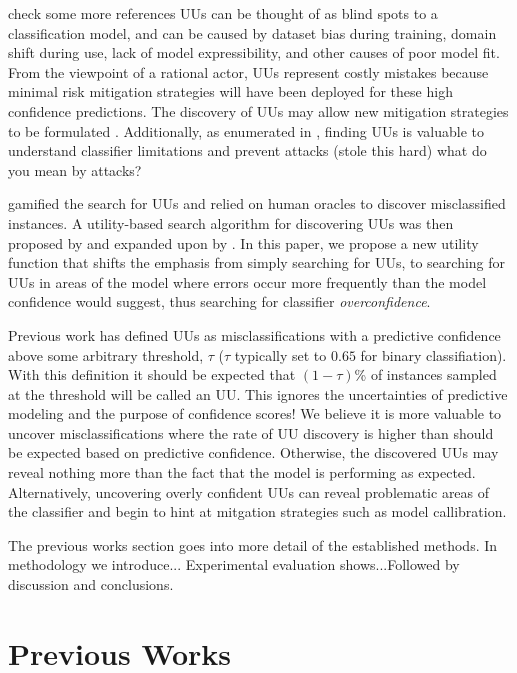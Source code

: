 \documentclass[letterpaper]{article} %
\newcommand{\km}[1]{{\color{red} #1}} %
\newcommand{\wdb}[1]{{\color{blue} #1}} %
\begin{document}
\wdb{check some more references}  UUs can be thought of as blind spots to a classification model, and can be caused by dataset bias during training, domain shift during use, lack of model expressibility, and other causes of poor model fit.  From the viewpoint of a rational actor, UUs represent costly mistakes because minimal risk mitigation strategies will have been deployed for these high confidence predictions.  The discovery of UUs may allow new mitigation strategies to be formulated \citep{Nushi2016a}.  \wdb{Additionally, as enumerated in \citep{Bansal2018}, finding UUs is valuable to understand classifier limitations and prevent attacks (stole this hard)} \km{what do you mean by attacks?}

\citet{Attenberg2015} gamified the search for UUs and relied on human oracles to discover misclassified instances. A utility-based search algorithm for discovering UUs was then proposed by \citet{Lakkaraju2016} and expanded upon by \citet{Bansal2018}. In this paper, we propose a new utility function that shifts the emphasis from simply searching for UUs, to searching for UUs in areas of the model where errors occur more frequently than the model confidence would suggest, thus searching for classifier \textit{overconfidence}. 

Previous work has defined UUs as misclassifications with a predictive confidence above some arbitrary threshold, $\tau$ ($\tau$ typically set to $0.65$ for binary classifiation).  With this definition it should be expected that $(1-\tau)$\% of instances sampled at the threshold will be called an UU. This ignores the uncertainties of predictive modeling and the purpose of confidence scores!  We believe it is more valuable to uncover misclassifications where the rate of UU discovery is higher than should be expected based on predictive confidence. Otherwise, the discovered UUs may reveal nothing more than the fact that the model is performing as expected.  Alternatively, uncovering overly confident UUs can reveal problematic areas of the classifier and begin to hint at mitgation strategies such as model callibration.  



\wdb{The previous works section goes into more detail of the established methods. In methodology we introduce... Experimental evaluation shows...Followed by discussion and conclusions.}

\section{Previous Works}
\end{document}
